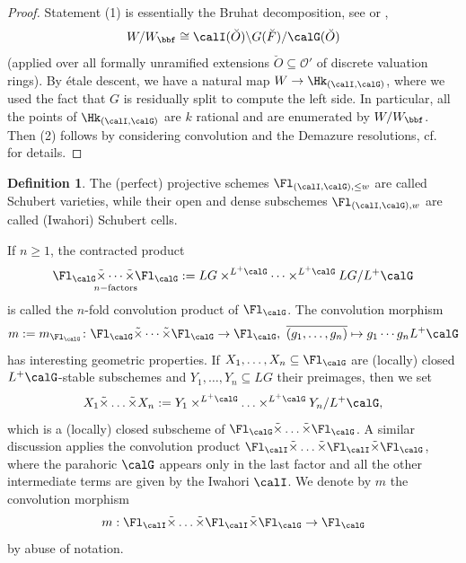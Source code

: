 \documentclass[10pt, reqno]{amsart}
\theoremstyle{plain}
\theoremstyle{definition}
\newtheorem{definition}[theorem]{Definition}
\numberwithin{equation}{section}
\begin{document}
	\begin{proof}
		Statement (1) is essentially the Bruhat decomposition, see \cite[Section 6.5]{BT72} or \cite[Theorem 7.8.1]{KP23},
		\begin{equation}
			W/W_\bbf\cong \calI(\breve{O})\backslash G(\breve{F})/\calG(\breve{O})
		\end{equation}
		(applied over all formally unramified extensions $\breve{O}\subseteq \mathcal{O}'$ of discrete valuation rings). By étale descent, we have a natural map $W\to \Hk_{(\calI,\calG)}$, where we used the fact that $G$ is residually split to compute the left side. In particular, all the points of $\Hk_{(\calI,\calG)}$ are $k$ rational and are enumerated by $W/W_\bbf$.
		Then (2) follows by considering convolution and the Demazure resolutions, cf.\ \cite[Section 1.4]{Zhu17} for details.
	\end{proof}
	
	\begin{definition}
		\label{sec:geometry-affine-flag-5-definition-schubert-varieties}
		The (perfect) projective schemes $\Fl_{(\calI,\calG),\leq w}$ are called Schubert varieties, while their open and dense subschemes $\Fl_{(\calI,\calG), w}$ are called (Iwahori) Schubert cells.
	\end{definition}
	
	
	
	If $n\geq 1$, the contracted product
	\begin{equation}
		\underset{n-\textrm{factors}}{ \Fl_\calG\tilde{\times}\cdots \tilde{\times} \Fl_\calG}:=LG\times^{L^+\calG}\cdots \times^{L^+\calG} LG/L^+\calG
	\end{equation}
	is called the $n$-fold convolution product of $\Fl_\calG$. The convolution morphism
	\begin{equation}
		m:=m_{\Fl_{\calG}}\colon \Fl_\calG\tilde{\times} \cdots \tilde{\times} \Fl_\calG\to \Fl_\calG,\ \overline{(g_1,\ldots, g_n)}\mapsto g_1\cdots g_nL^+\calG
	\end{equation}
	has interesting geometric properties. If $X_1,\ldots, X_n\subseteq \Fl_{\calG}$ are (locally) closed $L^+\calG$-stable subschemes and $Y_1,\ldots, Y_n\subseteq LG$ their preimages, then we set
	\begin{equation}
		X_1\tilde{\times}\ldots \tilde{\times} X_n:= Y_1\times^{L^+\calG}\ldots \times^{L^+\calG} Y_n/L^+\calG,
	\end{equation}
	which is a (locally) closed subscheme of $\Fl_{\calG}\tilde{\times}\ldots \tilde{\times} \Fl_{\calG}$. A similar discussion applies the convolution product $\Fl_{\calI} \tilde{\times}\ldots \tilde{\times} \Fl_{\calI}\tilde{\times}\Fl_{ \calG}$, where the parahoric $\calG$ appears only in the last factor and all the other intermediate terms are given by the Iwahori $\calI$. We denote by $m$ the convolution morphism
	$$
	m: \Fl_{\calI} \tilde{\times}\ldots \tilde{\times} \Fl_{\calI}\tilde{\times}\Fl_{ \calG}\rightarrow \Fl_\calG
	$$
	by abuse of notation. 
	
\end{document}
